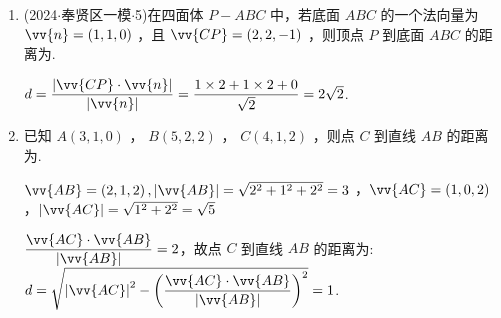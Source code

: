 \begin{enumerate}
\begin{jieda}
\begin{enumerate}
            \item 由(1)得 ${CE} \bot$ 平面 ${PAD} \Longrightarrow  {CE} \bot  {PE},{CE} \bot  {AE}$ ，所以 $\angle {PEA}$ 为所求二面角 $P - {CE} - A$ 的平面角; 四棱锥的体积为 $\dfrac{5}{6}$ , ${V}_{P - {ABCD}} = \dfrac{1}{3}{Sh} = \dfrac{1}{3} \times  \dfrac{{BC} + {AD}}{2} \times  {AB} \times  {PA},{AB} = 1,{AD} =  3,{CD} = \sqrt{2},\angle {CDA} = {45}^{ \circ  }$ ,则 ${CE} = {AB} = 1,{ED} = {CE} = 1$ ,故 ${BC} = {AE} = 2$ ,代入体积公式可解得 ${PA} = h = 1,{PA} = 1$ ,$\tan \angle {PEA} = \dfrac{PA}{AE} = \dfrac{1}{2} \Longrightarrow  \angle {PEA} = \arctan \dfrac{1}{2}$ ,所以二面角 $P - {CE} - A$ 的平面角的大小为 $\arctan \dfrac{1}{2}$ .
        \end{enumerate}
    \end{jieda}
    \item (2024$\cdot$奉贤区一模$\cdot$5)在四面体 $P - {ABC}$ 中，若底面 ${ABC}$ 的一个法向量为 $\vv{n} = \left( {1,1,0}\right)$ ，且 $\vv{CP} = \left( {2,2, -1}\right)$ ，则顶点 $P$ 到底面 ${ABC}$ 的距离为.
    \begin{jieda}
        $d = \dfrac{\left| \vv{CP} \cdot  \vv{n}\right| }{\left| \vv{n}\right| } = \dfrac{1 \times  2 + 1 \times  2 + 0}{\sqrt{2}} = 2\sqrt{2}$.
    \end{jieda}
    \item 已知 $A\left( {3,1,0}\right)$ ， $B\left( {5,2,2}\right)$ ， $C\left( {4,1,2}\right)$ ，则点 $C$ 到直线 ${AB}$ 的距离为.
    \begin{jieda}
        $\vv{AB} = \left( {2,1,2}\right) ,\left| \vv{AB}\right|  = \sqrt{{2}^{2} + {1}^{2} + {2}^{2}} = 3$ ，$\vv{AC} = \left( {1,0,2}\right)$，$\left| \vv{AC}\right|  = \sqrt{{1}^{2} + {2}^{2}} = \sqrt{5}$

        $\dfrac{\vv{AC} \cdot  \vv{AB}}{\left|\vv{AB}\right|} = 2$，故点 $C$ 到直线 ${AB}$ 的距离为: $d = \sqrt{{\left| \vv{AC}\right| }^{2} - {\left(\dfrac{\vv{AC} \cdot  \vv{AB}}{\left|\vv{AB}\right|}\right) }^{2}} = 1$.

    \end{jieda}
\end{enumerate}
